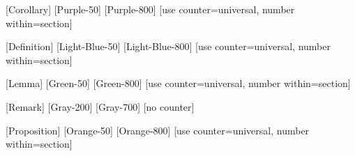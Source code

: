 
 [Corollary] [Purple-50] [Purple-800]
[use counter=universal, number within=section]

\newenvironment{corollary}[1][] {\begin{Corollary}{#1}{}} {\end{Corollary}}

 [Definition] [Light-Blue-50] [Light-Blue-800]
[use counter=universal, number within=section]

\newenvironment{definition}[1][] {\begin{Definition}{#1}{}} {\end{Definition}}

\theoremstyle{definition}
\newtheorem*{Example}{\color{primary}Example}

\newenvironment{example}
{\begin{Example}}
        {\hfill\ensuremath{\color{primary}\diamondsuit}\end{Example}}

 [Lemma] [Green-50] [Green-800]
[use counter=universal, number within=section]

\newenvironment{lemma}[1][] {\begin{Lemma}{#1}{}} {\end{Lemma}}

 [Remark] [Gray-200] [Gray-700] [no counter]

\newenvironment{remark}[1][] {\begin{Remark}{#1}{}} {\end{Remark}}

 [Proposition] [Orange-50] [Orange-800]
[use counter=universal, number within=section]

\newenvironment{proposition}[1][] {\begin{Proposition}{#1}{}} {\end{Proposition}}


